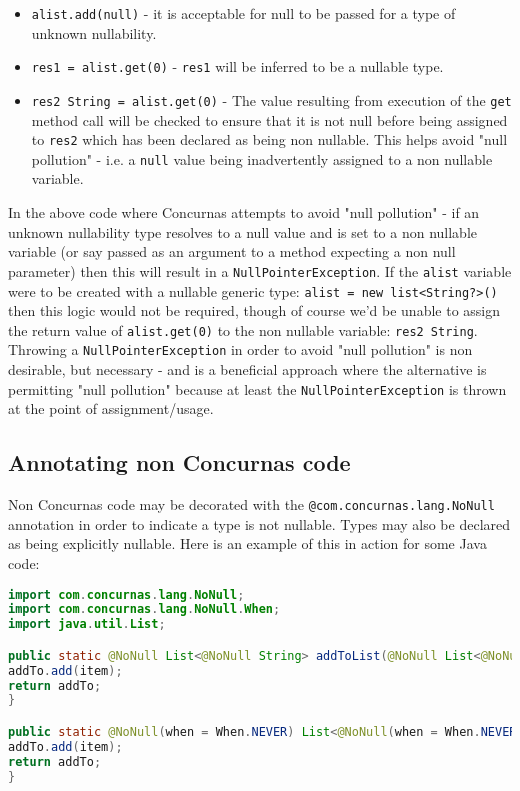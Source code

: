 \documentclass[conc-doc]{subfiles}
\begin{document}
\begin{itemize}
	\item \lstinline{alist.add(null)} - it is acceptable for null to be passed for a type of unknown nullability.
	\item \lstinline{res1 = alist.get(0)} - \lstinline{res1} will be inferred to be a nullable type.
	\item \lstinline{res2 String = alist.get(0)} - The value resulting from execution of the \lstinline{get} method call will be checked to ensure that it is not null before being assigned to \lstinline{res2} which has been declared as being non nullable. This helps avoid "null pollution" - i.e. a \lstinline{null} value being inadvertently assigned to a non nullable variable.
\end{itemize}

In the above code where Concurnas attempts to avoid "null pollution" - if an unknown nullability type resolves to a null value and is set to a non nullable variable (or say passed as an argument to a method expecting a non null parameter) then this will result in a \lstinline{NullPointerException}. If the \lstinline{alist} variable were to be created with a nullable generic type: \lstinline{alist = new list<String?>()} then this logic would not be required, though of course we'd be unable to assign the return value of \lstinline{alist.get(0)} to the non nullable variable: \lstinline{res2 String}. Throwing a \lstinline{NullPointerException} in order to avoid "null pollution" is non desirable, but necessary - and is a beneficial approach where the alternative is permitting "null pollution" because at least the \lstinline{NullPointerException} is thrown at the point of assignment/usage.

\subsection{Annotating non Concurnas code}
\label{subsubsec:annotatenonconc}
Non Concurnas code may be decorated with the \lstinline{@com.concurnas.lang.NoNull} annotation in order to indicate a type is not nullable. Types may also be declared as being explicitly nullable. Here is an example of this in action for some Java code:

\begin{lstlisting}[language = Java]
import com.concurnas.lang.NoNull;
import com.concurnas.lang.NoNull.When;
import java.util.List;

public static @NoNull List<@NoNull String> addToList(@NoNull List<@NoNull String> addTo, @NoNull String item ){
addTo.add(item);
return addTo;
}

public static @NoNull(when = When.NEVER) List<@NoNull(when = When.NEVER) String> addToListNULL(@NoNull(when = When.NEVER) List<@NoNull(when = When.NEVER) String> addTo, @NoNull(when = When.NEVER) String item ){
addTo.add(item);
return addTo;
}
\end{lstlisting}
\end{document}
